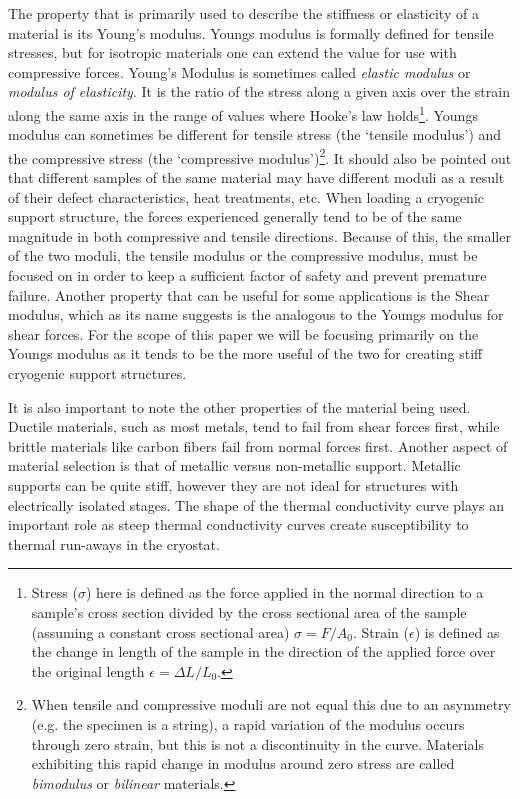 \documentclass[final]{svjour2}
\begin{document}
The property that is primarily used to describe the stiffness or elasticity of a material is its Young's modulus. Youngs modulus is formally defined for tensile stresses, but for isotropic materials one can extend the value for use with compressive forces. Young's Modulus is sometimes called {\em elastic modulus} or {\em modulus of elasticity}. It is the ratio of the stress along a given axis over the strain along the same axis in the range of values where Hooke's law holds\footnote{Stress ($\sigma$) here is defined as the force applied in the normal direction to a sample's cross section divided by the cross sectional area of the sample (assuming a constant cross sectional area) $\sigma = F/A_{0}$.  Strain ($\epsilon$) is defined as the change in length of the sample in the direction of the applied force over the original length $\epsilon=\Delta L/L_{0}$.}.  Youngs modulus can sometimes be different for tensile stress (the `tensile modulus') and the compressive stress (the `compressive modulus')\footnote{When tensile and compressive moduli are not equal this due to an asymmetry (e.g. the specimen is a string), a rapid variation of the modulus occurs through zero strain, but this is not a discontinuity in the curve. Materials exhibiting this rapid change in modulus around zero stress are called {\em bimodulus} or {\em bilinear} materials.}. It should also be pointed out that different samples of the same material may have different moduli as a result of their defect characteristics, heat treatments, etc. When loading a cryogenic support structure, the forces experienced generally tend to be of the same magnitude in both compressive and tensile directions.  Because of this, the smaller of the two moduli, the tensile modulus or the compressive modulus, must be focused on in order to keep a sufficient factor of safety and prevent premature failure. Another property that can be useful for some applications is the Shear modulus, which as its name suggests is the analogous to the Youngs modulus for shear forces.  For the scope of this paper we will be focusing primarily on the Youngs modulus as it tends to be the more useful of the two for creating stiff cryogenic support structures.

It is also important to note the other properties of the material being used.  Ductile materials, such as most metals, tend to fail from shear forces first, while brittle materials like carbon fibers fail from normal forces first.  Another aspect of material selection is that of metallic versus non-metallic support. Metallic supports can be quite stiff, however they are not ideal for structures with electrically isolated stages.  The shape of the thermal conductivity curve plays an important role as steep thermal conductivity curves create susceptibility to thermal run-aways in the cryostat.
\end{document}
